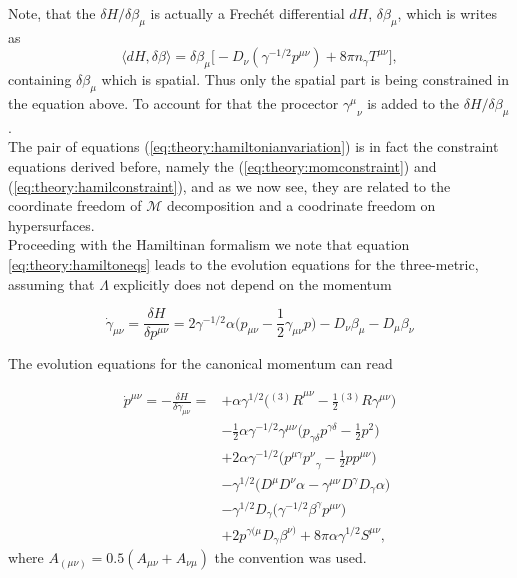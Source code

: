 \documentclass[11pt,a4paper,headinclude=true,DIV=14,BCOR=8mm,chapterprefix,listof=totoc,twoside,openright,abstracton]{scrbook}
\begin{document}
Note, that the $\delta H / \delta\beta_{\mu}$ is actually a Frech\'et differential $dH$, $\delta \beta_{\mu}$, which is writes as
\begin{equation}
    \langle dH,\delta\beta \rangle = \delta\beta_{\mu}\big[-D_{\nu}(\gamma^{-1/2}p^{\mu\nu})+8\pi n_{\gamma}T^{\mu\nu}\big], 
\end{equation}
containing $\delta\beta_{\mu}$ which is spatial. Thus only the spatial part is being constrained in the equation above. To account for that the procector ${\gamma^{\mu}}_{\nu}$ is added to the $\delta H/\delta \beta_{\mu}$. \\

The pair of equations (\ref{eq:theory:hamiltonianvariation}) is in fact the constraint equations derived before, namely the (\ref{eq:theory:momconstraint}) and (\ref{eq:theory:hamilconstraint}), and as we now see, they are related to the coordinate freedom of $\mathcal{M}$ decomposition and a coodrinate freedom on hypersurfaces. \\

Proceeding with the Hamiltinan formalism we note that equation \ref{eq:theory:hamiltoneqs} leads to the evolution equations for the three-metric, assuming that $\Lambda$ explicitly does not depend on the momentum

\begin{equation}
    \dot{\gamma}_{\mu\nu} =\frac{\delta H}{\delta p^{\mu\nu}} = 2\gamma^{-1/2}\alpha\big(p_{\mu\nu}-\frac{1}{2}\gamma_{\mu\nu}p\big) - D_{\nu}\beta_{\mu}-D_{\mu}\beta_{\nu}
    \label{eq:theory:_adm_metric_evo}
\end{equation}

The evolution equations for the canonical momentum can read

\begin{align}
    \dot{p}^{\mu\nu} = -\frac{\delta H}{\delta \gamma_{\mu\nu}} = &+ \alpha\gamma^{1/2}\big({^{(3)}R}^{\mu\nu}-\frac{1}{2}{^{(3)}R\gamma^{\mu\nu}}\big) \\
    & - \frac{1}{2}\alpha\gamma^{-1/2}\gamma^{\mu\nu}\big(p_{\gamma\delta}p^{\gamma\delta}-\frac{1}{2}p^2\big) \\
    & + 2\alpha\gamma^{-1/2}\big(p^{\mu\gamma}{p^{\nu}}_{\gamma}-\frac{1}{2}pp^{\mu\nu}\big) \\
    & - \gamma^{1/2}\big(D^{\mu}D^{\nu}\alpha-\gamma^{\mu\nu}D^{\gamma}D_{\gamma}\alpha\big) \\
    & - \gamma^{1/2}D_{\gamma}\big(\gamma^{-1/2}\beta^{\gamma}p^{\mu\nu}\big) \\
    &+ 2p^{\gamma(\mu}D_{\gamma}\beta^{\nu)} + 8\pi \alpha \gamma^{1/2}S^{\mu\nu},
    \label{eq:theory:_adm_mom_evo}
\end{align}
where $A_{(\mu\nu)} = 0.5(A_{\mu\nu}+A_{\nu\mu})$ the convention was used. \\
\end{document}
